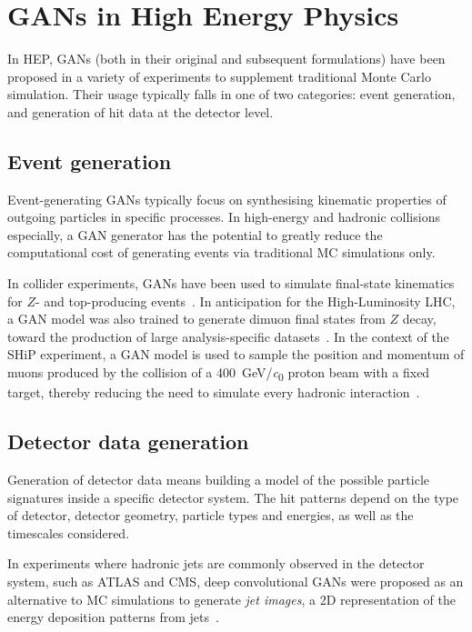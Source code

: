 \section{GANs in High Energy Physics}
In HEP, GANs (both in their original and subsequent formulations) have been
proposed in a variety of experiments to supplement traditional Monte Carlo
simulation. Their usage typically falls in one of two categories: event
generation, and generation of hit data at the detector level.

\subsection{Event generation}
Event-generating GANs typically focus on synthesising kinematic properties of
outgoing particles in specific processes. In high-energy and hadronic collisions
especially, a GAN generator has the potential to greatly reduce the
computational cost of generating events via traditional MC simulations only.

In collider experiments, GANs have been used to simulate final-state kinematics
for $Z$- and top-producing events~\cite{butter_how_2019, otten_event_2019}. In
anticipation for the High-Luminosity LHC, a GAN model was also trained to
generate dimuon final states from $Z$ decay, toward the production of large
analysis-specific datasets~\cite{hashemi2019lhc}. In the context of the SHiP
experiment, a GAN model is used to sample the position and momentum of muons
produced by the collision of a \SI{400}{\GeV/\clight} proton beam with a fixed
target, thereby reducing the need to simulate every
hadronic interaction~\cite{ahdida_fast_2019}.


\subsection{Detector data generation}
Generation of detector data means building a model of the possible particle
signatures inside a specific detector system. The hit patterns depend on the
type of detector, detector geometry, particle types and energies, as well as the
timescales considered.

In experiments where hadronic jets are commonly observed in the detector system,
such as ATLAS and CMS, deep convolutional GANs were proposed as an alternative
to MC simulations to generate \emph{jet images}, a 2D representation of the
energy deposition patterns from jets~\cite{deOliveira2017a}.

